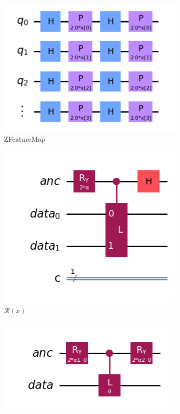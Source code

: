 \documentclass[a4paper]{article}
\begin{document}
\begin{itemize}
\begin{figure}[h]
\centering
\begin{subfigure}{.2\textwidth}
  \centering
\includegraphics[height = 0.7\textwidth]{assets/zfm.png}
  \caption{ZFeatureMap}
  \label{fig:sub1}
\end{subfigure}%
\begin{subfigure}{.2\textwidth}
  \centering
  \includegraphics[height=.7\linewidth]{assets/rb.png}
  \caption{$\mathcal{R}(x)$}
  \label{fig:sub2}
\end{subfigure}%
\begin{subfigure}{.2\textwidth}
  \centering
  \includegraphics[height=.7\linewidth, width=.9\linewidth]{assets/r2.png}

\end{subfigure}
\end{figure}
\end{itemize}
\end{document}
